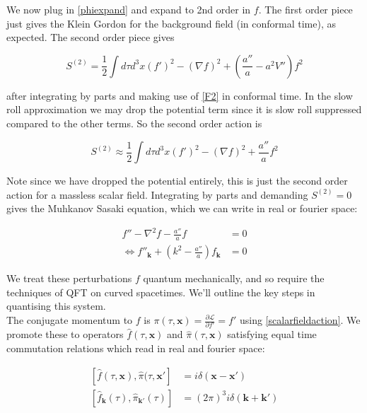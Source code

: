 \documentclass[a4paper,10pt]{article}
\renewcommand{\v}[1]{\mathbf{#1}}
\newcommand{\half}{\frac{1}{2}}
\begin{document}
We now plug in \ref{phiexpand} and expand to 2nd order in $f$. The first order piece just gives the Klein Gordon for the background field (in conformal time), as expected. The second order piece gives

\begin{equation}
S^{(2)} = \half \int d\tau d^3x (f')^2 - (\nabla f)^2 + (\frac{a''}{a}-a^2V'')f^2
\end{equation}

after integrating by parts and making use of \ref{F2} in conformal time. In the slow roll approximation we may drop the potential term since it is slow roll suppressed compared to the other terms. So the second order action is 

\begin{equation}
S^{(2)} \approx \half \int d\tau d^3x (f')^2 - (\nabla f)^2 + \frac{a''}{a}f^2
\end{equation}

Note since we have dropped the potential entirely, this is just the second order action for a massless scalar field. Integrating by parts and demanding $S^{(2)}=0$ gives the Muhkanov Sasaki equation, which we can write in real or fourier space:

\begin{equation}\begin{split}
f''-\nabla^2f-\frac{a''}{a}f &= 0 \\
\Leftrightarrow f''_{\v{k}} + (k^2-\frac{a''}{a})f_{\v{k}} &= 0
\label{MS}
\end{split}\end{equation}

We treat these perturbations $f$ quantum mechanically, and so require the techniques of QFT on curved spacetimes. We'll outline the key steps in quantising this system.\\

The conjugate momentum to $f$ is $\pi(\tau, \v{x}) =  \frac{\partial \mathcal{L}}{\partial f'} = f'$ using \ref{scalarfieldaction}. We promote these to operators $\hat{f}(\tau, \v{x})$ and $\hat{\pi}(\tau, \v{x})$ satisfying equal time commutation relations which read in real and fourier space:

\begin{equation}\begin{split}
[\hat{f}(\tau, \v{x}), \hat{\pi}(\tau, \v{x'}] &= i\delta(\v{x}-\v{x'}) \\
[\hat{f}_{\v{k}}(\tau), \hat{\pi}_{\v{k'}}(\tau)] &= (2\pi)^3i\delta(\v{k}+\v{k'})
\end{split}\end{equation}
\end{document}

